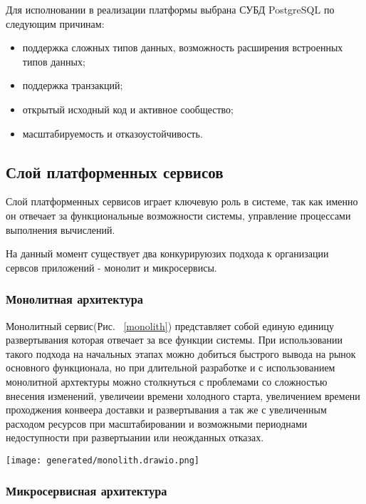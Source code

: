 Для исполновании в реализации платформы выбрана СУБД PostgreSQL по следующим причинам:

\begin{itemize}
  \item[---]поддержка сложных типов данных, возможность расширения встроенных типов данных;
  \item[---]поддержка транзакций;
  \item[---]открытый исходный код и активное сообщество;
  \item[---]масштабируемость и отказоустойчивость.
\end{itemize}

\subsection{Слой платформенных сервисов}

Слой платформенных сервисов играет ключевую роль в системе, так как именно он отвечает за функциональные возможности системы, управление процессами выполнения вычислений.

На данный момент существует два конкурируюзих подхода к организации сервсов приложений - монолит и микросервисы\cite{newman2019monolith}.

\subsubsection{Монолитная архитектура}

Монолитный сервис(Рис. ~\ref{monolith}) представляет собой единую единицу развертывания которая отвечает за все функции системы. При использовании такого подхода на начальных этапах можно добиться быстрого вывода на рынок основного функционала, но при длительной разработке и с использованием монолитной архтектуры можно столкнуться с проблемами со сложностью внесения изменений, увеличеии времени холодного старта, увеличением времени проходжения конвеера доставки и развертывания а так же с увеличенным расходом ресурсов при масштабировании и возможными периоднами недоступности при развертыании или неожданных отказах.

\begin{figure*}[!t]
  \centering
  \texttt{[image: generated/monolith.drawio.png]}
  \caption{Приложение с монолитной архитектурой}
  \label{monolith}
\end{figure*}

\subsubsection{Микросервисная архитектура}

